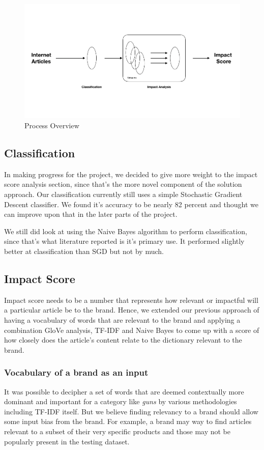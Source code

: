 \documentclass{article}
\begin{document}
\begin{figure}
	\centering
 	 \includegraphics[width=0.6\linewidth]{impact_score.png}
	  \caption{Process Overview}
 	 \label{fig:Impact Potential}
\end{figure}

\subsection {Classification}
In making progress for the project, we decided to give more weight to the impact score analysis section, since that's the more novel component of the solution approach. Our classification currently still uses a simple Stochastic Gradient Descent classifier. We found it's accuracy to be nearly 82 percent and thought we can improve upon that in the later parts of the project.

We still did look at using the Naive Bayes algorithm to perform classification, since that's what literature reported is it's primary use. It performed slightly better at classification than SGD but not by much.

\subsection {Impact Score}

Impact score needs to be a number that represents how relevant or impactful will a particular article be to the brand. Hence, we extended our previous approach of having a vocabulary of words that are relevant to the brand and applying a combination GloVe analysis, TF-IDF and Naive Bayes to come up with a score of how closely does the article's content relate to the dictionary relevant to the brand.

\subsubsection {Vocabulary of a brand as an input}
It was possible to decipher a set of words that are deemed contextually more dominant and important for a category like \textit{guns} by various methodologies including TF-IDF itself. But we believe finding relevancy to a brand should allow some input bias from the brand. For example, a brand may way to find articles relevant to a subset of their very specific products and those may not be popularly present in the testing dataset. 
\end{document}

